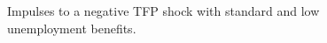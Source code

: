 



\begin{figure}[H]
\caption[Caption for LOF]{Impulses to a negative TFP shock with standard and low unemployment benefits.}
\label{fig:lower_b_main}
\end{figure}

